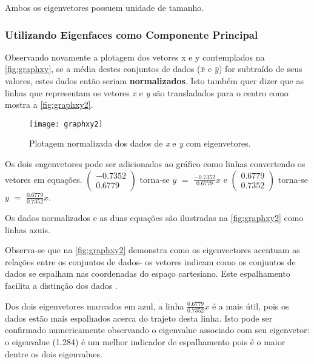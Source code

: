 Ambos os eigenvetores possuem unidade de tamanho.

\subsubsection{Utilizando Eigenfaces como Componente Principal}\label{subsec:eigenacp}

Observando novamente a plotagem dos vetores x e y contemplados na \autoref{fig:graphxy}, se a média destes conjuntos de dados ($\bar{x}$ e $\bar{y}$) for subtraído de seus valores, estes dados então seriam \textbf{normalizados}. Isto também quer dizer que as linhas que representam os vetores \textit{x} e \textit{y} são transladados para o centro como mostra a \autoref{fig:graphxy2}. 

\begin{figure}[h]
	\centering
	\texttt{[image: graphxy2]}
	\caption{Plotagem normalizada dos dados de \textit{x} e \textit{y} com eigenvetores.}
	\label{fig:graphxy2}
\end{figure}

Os dois engenvetores pode ser adicionados ao gráfico como linhas convertendo os vetores em equações. 
$\begin{pmatrix} -0.7352 \\ 0.6779 \end{pmatrix}$ torna-se $y$ $=$ $\frac{-0.7352}{0.6779}$$x$  e $\begin{pmatrix} 0.6779 \\ 0.7352 \end{pmatrix}$ torna-se $y$ $=$ $\frac{0.6779}{0.7352}$$x$.

Os dados normalizados e as duas equações são ilustradas na \autoref{fig:graphxy2} como linhas azuis. 

Observa-se que na \autoref{fig:graphxy2} demonstra como os eigenvectores acentuam as relações entre os conjuntos de dados- os vetores indicam como os conjuntos de dados se espalham nas coordenadas do espaço cartesiano. Este espalhamento facilita a distinção dos dados \cite{drmathew_java_programming}.

Dos dois eigenvetores marcados em azul, a linha $\frac{0.6779}{0.7352}$$x$ é a mais útil, pois os dados estão mais espalhados acerca do trajeto desta linha. Isto pode ser confirmado numericamente observando o eigenvalue associado com seu eigenvetor: o eigenvalue (1.284) é um melhor indicador de espalhamento pois é o maior dentre os dois eigenvalues.

